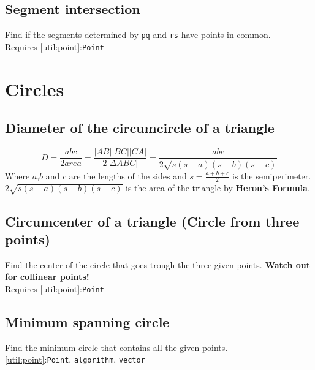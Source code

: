 \documentclass[11pt, oneside]{article}   	%
\begin{document}

\subsection{Segment intersection}
Find if the segments determined by \verb|pq| and \verb|rs| have points in common.\\
Requires \ref{util:point}:\verb|Point| 


\section{Circles}
\subsection{Diameter of the circumcircle of  a triangle}
\[ D = \frac{abc}{2 area} = 	\frac{|AB||BC||CA|}{2|\Delta ABC|} = \frac{abc}{2\sqrt{s(s-a)(s-b)(s-c)}}\]
Where $a$,$b$ and $c$ are the lengths of the sides and $s = \frac{a + b + c}{2}$ is the semiperimeter. $2\sqrt{s(s-a)(s-b)(s-c)}$ is the area of the triangle by \textbf{Heron's Formula}.

\subsection{Circumcenter of a triangle (Circle from three points)}
Find the center of the circle that goes trough the three given points. \textbf{Watch out for collinear points!}\\
Requires \ref{util:point}:\verb|Point|


\subsection{Minimum spanning circle}
Find the minimum circle that contains all the given points.\\
\ref{util:point}:\verb|Point|, \verb|algorithm|, \verb|vector|

\end{document}
